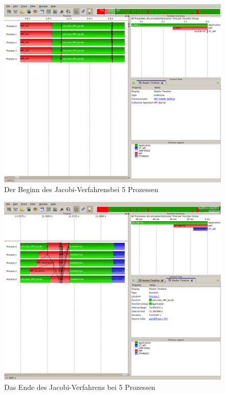\documentclass[a4paper,12pt]{scrartcl}
\begin{document}
\begin{figure}[hr!]
 \includegraphics[scale=0.45]{./5_4_JA/Start.png}
 \caption{Der Beginn des Jacobi-Verfahrensbei 5 Prozessen}
\end{figure}
\begin{figure}[hr!]
 \includegraphics[scale=0.45]{./5_4_JA/End.png}
 \caption{Das Ende des Jacobi-Verfahrens bei 5 Prozessen}
\end{figure}
\end{document}
